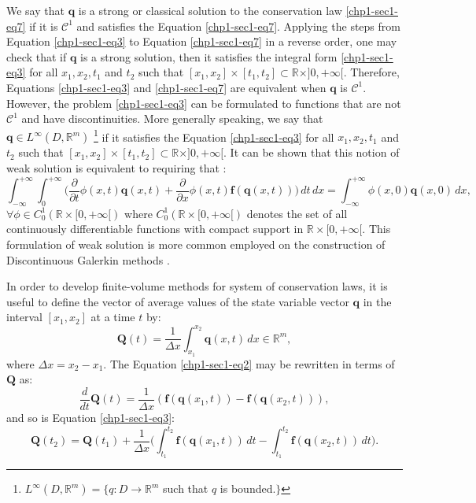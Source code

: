We say that $\mathbf{q}$ is a strong or classical solution to the conservation law \eqref{chp1-sec1-eq7}
if it is $\mathcal{C}^1$ and satisfies the Equation \eqref{chp1-sec1-eq7}.
Applying the steps from Equation \eqref{chp1-sec1-eq3} to Equation \eqref{chp1-sec1-eq7}
in a reverse order, one may check that if $\mathbf{q}$ is a strong solution,
then it satisfies the integral form \eqref{chp1-sec1-eq3} for all $x_1, x_2, t_1$ and $t_2$ such that
$[x_1, x_2] \times [t_1, t_2] \subset \mathbb{R}\times ]0, +\infty[$. 
Therefore, Equations \eqref{chp1-sec1-eq3} and \eqref{chp1-sec1-eq7} are
equivalent when $\mathbf{q}$ is $\mathcal{C}^1$.
However, the problem \eqref{chp1-sec1-eq3} can be formulated
to functions that are not $\mathcal{C}^1$ and have discontinuities.
More generally speaking, we say that $\mathbf{q} \in L^{\infty}(D, \mathbb{R}^m)$ 
\footnote{$L^{\infty}(D, \mathbb{R}^m) = \{q: D \to \mathbb{R}^m$
such that $q$ is bounded.$\}$}
if it satisfies the Equation 
\eqref{chp1-sec1-eq3} for all $x_1, x_2, t_1$ and $t_2$ such that
$[x_1, x_2] \times [t_1, t_2] \subset \mathbb{R}\times ]0, +\infty[$.
It can be shown that this notion of weak solution is equivalent to requiring that \citep{leveque:1990}:
\begin{equation}
	\label{chp1-sec1-eq8}
	\int_{-\infty}^{+\infty} \int_{0}^{+\infty} \bigg(
	\frac{\partial}{\partial t} \phi(x, t)\mathbf{q}(x, t) +
	\frac{\partial}{\partial x} \phi(x ,t)\mathbf{f}(\mathbf{q}(x, t)) 
	\bigg)\,dt \,dx = 
	\int_{-\infty}^{+\infty} \phi(x, 0)\mathbf{q}(x, 0) \,dx  , \quad
\end{equation}
$\forall \phi \in C_{0}^{1}(\mathbb{R}\times[0, +\infty[)$
where $C_{0}^{1}(\mathbb{R}\times[0, +\infty[)$ denotes the set
of all continuously differentiable functions with compact support 
in $\mathbb{R}\times[0, +\infty[$. This formulation of weak solution
is more common employed on the construction of Discontinuous Galerkin
methods \citep{nair:2011}.

In order to develop finite-volume methods for system of conservation laws, it is useful to define the vector of
average values of the state variable vector $\mathbf{q}$ in the interval $[x_1, x_2]$ at a time $t$ by:
\begin{equation}
	\label{chp1-sec1-eq9}
	\mathbf{Q}(t) = \frac{1}{\Delta x}
	\int_{x_1}^{x_2} \mathbf{q}(x,t) \,dx
	\in \mathbb{R}^m,
\end{equation}
where $\Delta x = x_2 - x_1$. The Equation \eqref{chp1-sec1-eq2} may be  rewritten in terms of $\mathbf{Q}$ as:
\begin{equation}
        \label{chp1-sec1-eq10}
	\frac{d}{dt} \mathbf{Q}(t) = \frac{1}{\Delta x} 
	(\mathbf{f}(\mathbf{q}(x_1,t)) - \mathbf{f}(\mathbf{q}(x_2,t))) ,
\end{equation}
and so is Equation \eqref{chp1-sec1-eq3}:
\begin{equation}
        \label{chp1-sec1-eq11}
	\mathbf{Q}(t_2) =  \mathbf{Q}(t_1) + 
	\frac{1}{\Delta x}\bigg( \int_{t_1}^{t_2} 
	\mathbf{f}(\mathbf{q}(x_1, t)) \,dt - 
	\int_{t_1}^{t_2}\mathbf{f}(\mathbf{q}(x_2, t)) \,dt \bigg).
\end{equation}

